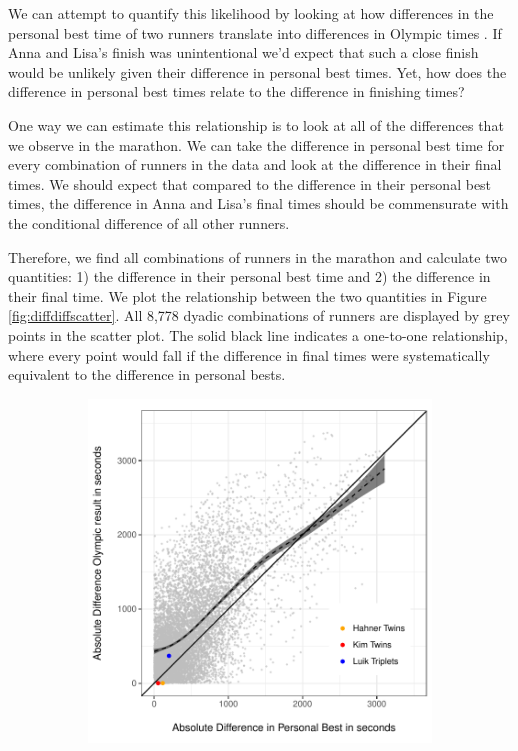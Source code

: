 \documentclass[12pt,titlepage]{article}
\begin{document}
We can attempt to quantify this likelihood by looking at how differences in the personal best time of two runners translate into differences in Olympic times .  If Anna and Lisa's finish was unintentional we'd expect that such a close finish would be unlikely given their difference in personal best times.   Yet, how does the difference in personal best times relate to the difference in finishing times?

One way we can estimate this relationship is to look at all of the differences that we observe in the marathon.  We can take the difference in personal best time for every combination of runners in the data and look at the difference in their final times.  We should expect that compared to the difference in their personal best times, the difference in Anna and Lisa's final times should be commensurate with the conditional difference of all other runners. %

Therefore, we find all combinations of runners in the marathon and calculate two quantities: 1) the difference in their personal best time and 2) the difference in their final time. We plot the relationship between the two quantities in Figure \ref{fig:diffdiffscatter}.   All 8,778 dyadic combinations of runners are displayed by grey points in the scatter plot.   The solid black line indicates a one-to-one relationship, where every point would fall if the difference in final times were systematically equivalent to the difference in personal bests.  


\begin{figure}[!ht]
 \caption{Relationship between Difference in Personal Best and Difference in Result}
 \label{fig:diffdiffscatter}
 \centering
 \begin{subfigure}{.5\textwidth}
 \includegraphics[width=\textwidth, keepaspectratio]{diff_in_diff_scatter_plot.pdf}
 \end{subfigure}
\end{figure}
\end{document}
